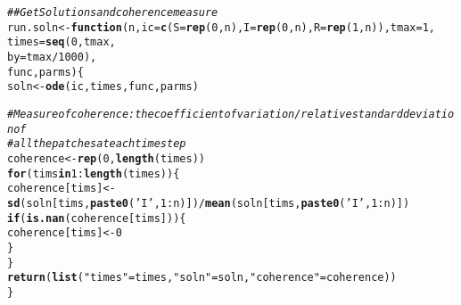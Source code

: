\documentclass{article}\usepackage[]{graphicx}\usepackage[]{color}
\makeatletter
\newcommand{\hlnum}[1]{\textcolor[rgb]{0.686,0.059,0.569}{#1}}%
\newcommand{\hlstr}[1]{\textcolor[rgb]{0.192,0.494,0.8}{#1}}%
\newcommand{\hlcom}[1]{\textcolor[rgb]{0.678,0.584,0.686}{\textit{#1}}}%
\newcommand{\hlopt}[1]{\textcolor[rgb]{0,0,0}{#1}}%
\newcommand{\hlstd}[1]{\textcolor[rgb]{0.345,0.345,0.345}{#1}}%
\newcommand{\hlkwa}[1]{\textcolor[rgb]{0.161,0.373,0.58}{\textbf{#1}}}%
\newcommand{\hlkwb}[1]{\textcolor[rgb]{0.69,0.353,0.396}{#1}}%
\newcommand{\hlkwc}[1]{\textcolor[rgb]{0.333,0.667,0.333}{#1}}%
\newcommand{\hlkwd}[1]{\textcolor[rgb]{0.737,0.353,0.396}{\textbf{#1}}}%
\newenvironment{kframe}{%
 \def\at@end@of@kframe{}%
 \ifinner\ifhmode%
  \def\at@end@of@kframe{\end{minipage}}%
  \begin{minipage}{\columnwidth}%
 \fi\fi%
 \def\FrameCommand##1{\hskip\@totalleftmargin \hskip-\fboxsep
 \colorbox{shadecolor}{##1}\hskip-\fboxsep
     \hskip-\linewidth \hskip-\@totalleftmargin \hskip\columnwidth}%
 \MakeFramed {\advance\hsize-\width
   \@totalleftmargin\z@ \linewidth\hsize
   \@setminipage}}%
 {\par\unskip\endMakeFramed%
 \at@end@of@kframe}
\newenvironment{knitrout}{}{} %
\makeatother
\begin{document}
\begin{knitrout}
\color{fgcolor}\begin{kframe}
\begin{alltt}
\hlcom{## Get Solutions and coherence measure}
\hlstd{run.soln} \hlkwb{<-} \hlkwa{function}\hlstd{(}\hlkwc{n}\hlstd{,}\hlkwc{ic}\hlstd{=}\hlkwd{c}\hlstd{(}\hlkwc{S}\hlstd{=}\hlkwd{rep}\hlstd{(}\hlnum{0}\hlstd{,n),}\hlkwc{I}\hlstd{=}\hlkwd{rep}\hlstd{(}\hlnum{0}\hlstd{,n),}\hlkwc{R}\hlstd{=}\hlkwd{rep}\hlstd{(}\hlnum{1}\hlstd{,n)),}\hlkwc{tmax}\hlstd{=}\hlnum{1}\hlstd{,}
                      \hlkwc{times}\hlstd{=}\hlkwd{seq}\hlstd{(}\hlnum{0}\hlstd{,tmax,}
                                \hlkwc{by}\hlstd{=tmax}\hlopt{/}\hlnum{1000}\hlstd{),}
                      \hlkwc{func}\hlstd{,}\hlkwc{parms}\hlstd{) \{}
  \hlstd{soln} \hlkwb{<-} \hlkwd{ode}\hlstd{(ic,times,func,parms)}

   \hlcom{#Measure of coherence: the coefficient of variation/relative standard deviation of }
  \hlcom{#all the patches at each time step}
  \hlstd{coherence} \hlkwb{<-} \hlkwd{rep}\hlstd{(}\hlnum{0}\hlstd{,}\hlkwd{length}\hlstd{(times))}
  \hlkwa{for}\hlstd{(tims} \hlkwa{in} \hlnum{1}\hlopt{:}\hlkwd{length}\hlstd{(times))\{}
    \hlstd{coherence[tims]}\hlkwb{<-} \hlkwd{sd}\hlstd{(soln[tims,}\hlkwd{paste0}\hlstd{(}\hlstr{'I'}\hlstd{,}\hlnum{1}\hlopt{:}\hlstd{n)])}\hlopt{/}\hlkwd{mean}\hlstd{(soln[tims,}\hlkwd{paste0}\hlstd{(}\hlstr{'I'}\hlstd{,}\hlnum{1}\hlopt{:}\hlstd{n)])}
    \hlkwa{if}\hlstd{(}\hlkwd{is.nan}\hlstd{(coherence[tims]))\{}
      \hlstd{coherence[tims]}\hlkwb{<-} \hlnum{0}
    \hlstd{\}}
  \hlstd{\}}
  \hlkwd{return}\hlstd{(}\hlkwd{list}\hlstd{(}\hlstr{"times"}\hlstd{=times,} \hlstr{"soln"} \hlstd{= soln,} \hlstr{"coherence"}\hlstd{= coherence))}
\hlstd{\}}
\end{alltt}
\end{kframe}
\end{knitrout}
\end{document}

